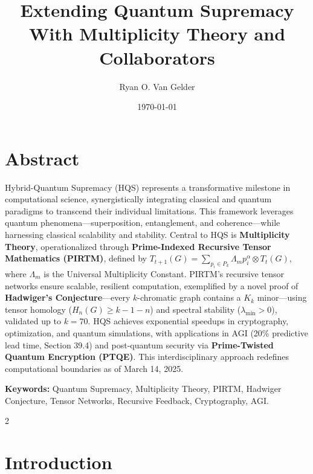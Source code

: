 \documentclass{article}
\theoremstyle{plain}
\begin{document}
\title{Extending Quantum Supremacy \\With Multiplicity Theory and Collaborators}

\author{Ryan O. Van Gelder}
\date{\today}
\maketitle

\section*{Abstract}
Hybrid-Quantum Supremacy (HQS) represents a transformative milestone in computational science, synergistically integrating classical and quantum paradigms to transcend their individual limitations. This framework leverages quantum phenomena—superposition, entanglement, and coherence—while harnessing classical scalability and stability. Central to HQS is \textbf{Multiplicity Theory}, operationalized through \textbf{Prime-Indexed Recursive Tensor Mathematics (PIRTM)}, defined by \( T_{t+1}(G) = \sum_{p_i \in P_k} \Lambda_m p_i^\alpha \otimes T_t(G) \), where \( \Lambda_m \) is the Universal Multiplicity Constant. PIRTM’s recursive tensor networks ensure scalable, resilient computation, exemplified by a novel proof of \textbf{Hadwiger’s Conjecture}—every $k$-chromatic graph contains a $K_k$ minor—using tensor homology (\( H_n(G) \geq k-1-n \)) and spectral stability (\( \lambda_{\min} > 0 \)), validated up to $k=70$. HQS achieves exponential speedups in cryptography, optimization, and quantum simulations, with applications in AGI (20\% predictive lead time, Section 39.4) and post-quantum security via \textbf{Prime-Twisted Quantum Encryption (PTQE)}. This interdisciplinary approach redefines computational boundaries as of March 14, 2025.

\textbf{Keywords:} Quantum Supremacy, Multiplicity Theory, PIRTM, Hadwiger Conjecture, Tensor Networks, Recursive Feedback, Cryptography, AGI.
\newpage
\begin{multicols}{2}
\begin{singlespace}
\tableofcontents
\end{singlespace}
\end{multicols}

\section{Introduction}
\end{document}
